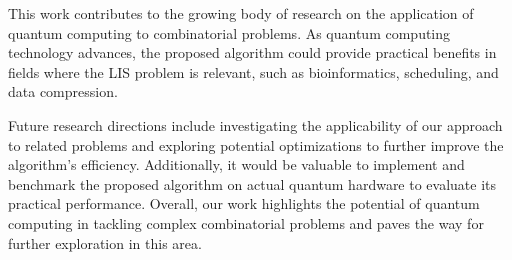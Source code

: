 This work contributes to the growing body of research on the application of quantum computing to combinatorial problems. As quantum computing technology advances, the proposed algorithm could provide practical benefits in fields where the LIS problem is relevant, such as bioinformatics, scheduling, and data compression.

Future research directions include investigating the applicability of our approach to related problems and exploring potential optimizations to further improve the algorithm's efficiency. Additionally, it would be valuable to implement and benchmark the proposed algorithm on actual quantum hardware to evaluate its practical performance. Overall, our work highlights the potential of quantum computing in tackling complex combinatorial problems and paves the way for further exploration in this area.

